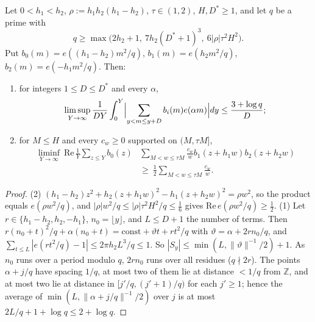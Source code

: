 \begin{proposition}[Barrier for non-negative coefficients, $k=3$]
\label{prop:barrier_pos}
Let $0<h_1<h_2$, $\rho:=h_1h_2(h_1-h_2)$, $\tau\in(1,2)$, $H,D^*\ge1$, and let $q$ be a prime with
\begin{equation}
q\ge\max\bigl(2h_2+1,\ 7h_2(D^*+1)^3,\ 6|\rho|\tau^2H^2\bigr).
\label{eq:q_choice}
\end{equation}
Put $b_0(m)=e((h_1-h_2)m^2/q)$, $b_1(m)=e(h_2m^2/q)$, $b_2(m)=e(-h_1m^2/q)$. Then:
\begin{enumerate}
\item for integers $1\le D\le D^*$ and every $\alpha$,
\begin{equation}
\limsup_{Y\to\infty}\frac1{DY}\int_0^Y\Bigl|\sum_{y<m\le y+D}b_i(m)e(\alpha m)\Bigr|dy\le\frac{3+\log q}{D};
\label{eq:barrier_pos_127}
\end{equation}
\item for $M\le H$ and every $c_w\ge0$ supported on $(M,\tau M]$,
\begin{equation}
\begin{aligned}
\liminf_{Y\to\infty}\ \mathrm{Re}\,\frac1Y\sum_{z\le Y}b_0(z)&\sum_{M<w\le\tau M}\frac{c_w}{w}b_1(z+h_1w)b_2(z+h_2w)\\
&\ge\ \frac12\sum_{M<w\le\tau M}\frac{c_w}{w}.
\end{aligned}
\label{eq:barrier_pos}
\end{equation}
\end{enumerate}
\end{proposition}

\begin{proof}
(2) $(h_1-h_2)z^2+h_2(z+h_1w)^2-h_1(z+h_2w)^2=\rho w^2$, so the product equals $e(\rho w^2/q)$, and $|\rho|w^2/q\le|\rho|\tau^2H^2/q\le\frac16$ gives $\mathrm{Re}\,e(\rho w^2/q)\ge\frac12$. (1) Let $r\in\{h_1-h_2,h_2,-h_1\}$, $n_0=\lfloor y\rfloor$, and $L\le D+1$ the number of terms. Then $r(n_0+t)^2/q+\alpha(n_0+t)=\mathrm{const}+\vartheta t+rt^2/q$ with $\vartheta=\alpha+2rn_0/q$, and $\sum_{t\le L}|e(rt^2/q)-1|\le2\pi h_2L^3/q\le1$. So $|S_y|\le\min(L,\|\vartheta\|^{-1}/2)+1$. As $n_0$ runs over a period modulo $q$, $2rn_0$ runs over all residues ($q\nmid2r$). The points $\alpha+j/q$ have spacing $1/q$, at most two of them lie at distance $<1/q$ from $\mathbb Z$, and at most two lie at distance in $[j'/q,(j'+1)/q)$ for each $j'\ge1$; hence the average of $\min(L,\|\alpha+j/q\|^{-1}/2)$ over $j$ is at most $2L/q+1+\log q\le2+\log q$.
\end{proof}

